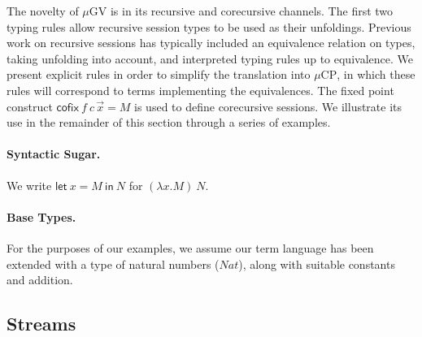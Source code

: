 \documentclass[orivec,envcountsame]{llncs}
\makeatletter
\newcommand{\lto}{\ensuremath{\multimap}}
\newcommand{\uto}{\ensuremath{\rightarrow}}
\newcommand{\mkwd}[1]{\mathsf{#1}}
\newcommand{\lrkwd}{\mkwd{cofix}}
\newcommand{\gvfix}[3]{\lrkwd\:#1\:#2 = #3}
\newcommand{\gvifthen}[3]{\mkwd{if}\:#1\:\mkwd{then}\:#2\:\mkwd{else}\:#3}
\newcommand{\key}{\mkwd}
\newcommand{\mucp}{$\mu\mathrm{CP}$\xspace}
\newcommand{\mugv}{$\mu\mathrm{GV}$\xspace}
\newcommand{\ba}{\begin{array}}
\newcommand{\ea}{\end{array}}
\newcommand{\bl}{\ba[t]{@{}l@{}}}
\newcommand{\el}{\ea}
\newcommand{\secref}[1]{(\S\ref{sec:#1})}
\makeatother
\begin{document}
The novelty of \mugv is in its recursive and corecursive channels. The first two typing rules allow
recursive session types to be used as their unfoldings. Previous work on recursive sessions has
typically included an equivalence relation on types, taking unfolding into account, and interpreted
typing rules up to equivalence. We present explicit rules in order to simplify the translation into
\mucp, in which these rules will correspond to terms implementing the equivalences.
%
The fixed point construct $\gvfix{f}{c\,\vec{x}}{M}$ is used to define corecursive sessions. We
illustrate its use in the remainder of this section through a series of examples.

\paragraph{Syntactic Sugar.}
%
We write $\key{let}\:x=M\:\key{in}\:N$ for $(\lambda x.M)\:N$.


\paragraph{Base Types.}

For the purposes of our examples, we assume our term language has been extended with a type of
natural numbers ($Nat$), along with suitable constants and addition.

%

\subsection{Streams}
\end{document}
